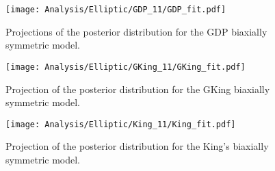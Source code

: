    
\begin {figure}
 \centering
 \texttt{[image: Analysis/Elliptic/GDP\_11/GDP\_fit.pdf]}
  \caption{Projections of the posterior distribution for the GDP biaxially symmetric model.}
\label{fig:GDP7Ell}
\end {figure}

\begin {figure}
 \centering
 \texttt{[image: Analysis/Elliptic/GKing\_11/GKing\_fit.pdf]}
  \caption{Projection of the posterior distribution for the GKing biaxially symmetric model.}
\label{fig:GKingEll}
\end {figure}

\begin {figure}
 \centering
 \texttt{[image: Analysis/Elliptic/King\_11/King\_fit.pdf]}
  \caption{Projection of the posterior distribution for  the King's biaxially symmetric model.}
\label{fig:KingEll}
\end {figure}

